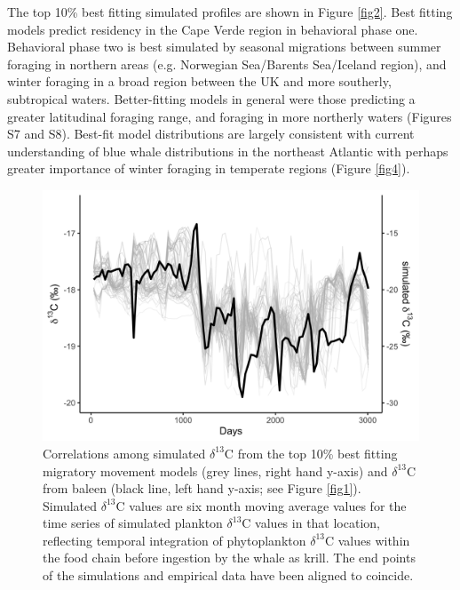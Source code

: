 \documentclass[a4paper,12pt]{article}
\begin{document}
The top 10\% best fitting simulated profiles are shown in Figure \ref{fig2}. 
Best fitting models predict residency in the Cape Verde region in behavioral phase one. Behavioral phase two is best simulated by seasonal migrations between summer foraging in northern areas (e.g. Norwegian Sea/Barents Sea/Iceland region), and winter foraging in a broad region between the UK and more southerly, subtropical waters. Better-fitting models in general were those predicting a greater latitudinal foraging range, and foraging in more northerly waters (Figures S7 and S8). 
Best-fit model distributions are largely consistent with current understanding of blue whale distributions in the northeast Atlantic \citep{reeves2004historical,baines2014upwellings,baines2017autumn,reeves2004historical} with perhaps greater importance of winter foraging in temperate regions (Figure \ref{fig4}).

\begin{figure}
 \centering
  \includegraphics[width = \linewidth]{figures/Figure-3-blue-sims.png}
  \caption{Correlations among simulated $\delta^{13}$C from the top 10\% best fitting migratory movement models (grey lines, right hand y-axis) and $\delta^{13}$C from baleen (black line, left hand y-axis; see Figure \ref{fig1}). 
  Simulated $\delta^{13}$C values are six month moving average values for the time series of simulated plankton $\delta^{13}$C values in that location, reflecting temporal integration of phytoplankton $\delta^{13}$C values within the food chain before ingestion by the whale as krill. 
  The end points of the simulations and empirical data have been aligned to coincide.
}
  \label{fig3}
\end{figure}
\end{document}
